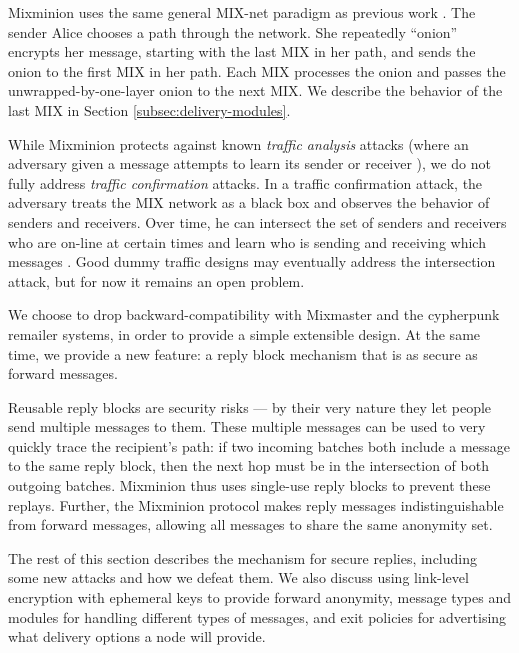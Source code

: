 \documentclass{llncs}
\begin{document}
Mixminion uses the same general MIX-net paradigm as previous work
\cite{chaum-mix, mixmaster-attacks, others}. The sender Alice chooses a
path through the network. She repeatedly ``onion'' encrypts her message,
starting with the last
MIX in her path, and sends the onion to the first MIX in her path. Each
MIX processes the onion and passes the unwrapped-by-one-layer onion to
the next MIX. We describe the behavior of the last MIX in
Section \ref{subsec:delivery-modules}.

While Mixminion protects against known \emph{traffic analysis} attacks
(where an adversary given a message attempts to learn its sender or
receiver \cite{jfraymond, simon}), we do not fully address \emph{traffic
confirmation} attacks. In a traffic confirmation attack, the adversary
treats the MIX network as a black box and observes the behavior of
senders and receivers. Over time, he can intersect the set of senders
and receivers who are on-line at certain times and learn who is sending
and receiving which messages \cite{langos02}. Good dummy traffic designs
may eventually address the intersection attack, but for now it remains
an open problem.

We choose to drop backward-compatibility with Mixmaster and the cypherpunk
remailer systems, in order to provide a simple extensible design. At
the same time, we provide a new feature: a reply block mechanism that
is as secure as forward messages.

Reusable reply blocks are security risks --- by their very nature they
let people send multiple messages to them. These multiple messages can be
used to very quickly trace the recipient's path: if two incoming batches
both include a message to the same reply block, then the next hop must
be in the intersection of both outgoing batches. Mixminion thus uses
single-use reply blocks to prevent these replays. Further, the Mixminion
protocol makes reply messages indistinguishable from forward messages,
allowing all messages to share the same anonymity set.

The rest of this section describes the mechanism for secure replies,
including some new attacks and how we defeat them. We also discuss using
link-level encryption with ephemeral keys to provide forward anonymity,
message types and modules for handling different types of messages, and
exit policies for advertising what delivery options a node will provide.

\end{document}
